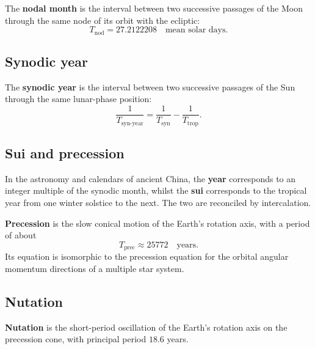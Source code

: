 \begin{definition}\label{def:nodal_month}
The \textbf{nodal month} is the interval between two successive passages of the Moon through the same node of its orbit with the ecliptic:
\[
T_{\text{nod}}=27.2122208\quad\text{mean solar days}.
\]
\end{definition}

\subsection{Synodic year}

\begin{definition}\label{def:synodic_year}
The \textbf{synodic year} is the interval between two successive passages of the Sun through the same lunar-phase position:
\[
\frac1{T_{\text{syn-year}}}=\frac1{T_{\text{syn}}}-\frac1{T_{\text{trop}}}.
\]
\end{definition}

\subsection{Sui and precession}

\begin{definition}[Sui]\label{def:sui}
In the astronomy and calendars of ancient China, the \textbf{year} corresponds to an integer multiple of the synodic month, whilst the \textbf{sui} corresponds to the tropical year from one winter solstice to the next. The two are reconciled by intercalation.
\end{definition}

\begin{definition}[Precession]\label{def:precession}
\textbf{Precession} is the slow conical motion of the Earth's rotation axis, with a period of about
\[
T_{\text{prec}}\approx25772\quad\text{years}.
\]
Its equation is isomorphic to the precession equation for the orbital angular momentum directions of a multiple star system.
\end{definition}

\subsection{Nutation}

\begin{definition}[Nutation]\label{def:nutation}
\textbf{Nutation} is the short-period oscillation of the Earth's rotation axis on the precession cone, with principal period \(18.6\) years.
\end{definition}


